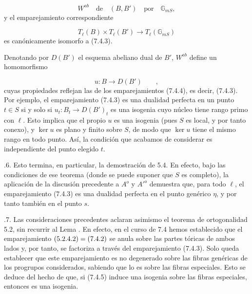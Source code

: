 \begin{equation*}
W^{ab}\quad\text{de}\quad(B,B')\quad\text{por}\quad\mathbb G_{mS},
\end{equation*}
y el emparejamiento correspondiente

\begin{equation}\tag{7.4.4}
T_{\ell}(B) \times T_{\ell}(B')
 \longrightarrow T_{\ell}(\mathbb G_{mS})
\end{equation}
es canónicamente isomorfo a (7.4.3).

Denotando por $D(B')$ el esquema abeliano dual de $B'$, $W^{ab}$ define
un homomorfismo

\begin{equation}\tag{7.4.5}
u:B\longrightarrow D(B') \qquad ,
\end{equation}
cuyas propiedades reflejan las de los emparejamientos (7.4.4), es
decir, (7.4.3). Por ejemplo, el emparejamiento (7.4.3) es una dualidad
perfecta en un punto $t\in S$ si y solo si
$u_t:B_t\longrightarrow D(B')_t$ es una isogenia cuyo núcleo tiene
rango primo con $\ell$. Esto implica que el propio $u$ es una isogenia
(pues $S$ es local, y por tanto conexo), y $\ker u$ es plano y finito
sobre $S$, de modo que $\ker u$ tiene el mismo rango en todo punto. Así,
la condición que acabamos de considerar es independiente del punto
elegido $t$.

\medskip
{}.6. Esto termina, en particular, la demostración de 5.4. En efecto,
bajo las condiciones de ese teorema (donde se puede suponer que $S$ es
completo), la aplicación de la discusión precedente a $A^o$ y
${A'}^o$ demuestra que, para todo $\ell$, el emparejamiento (7.4.3) es
una dualidad perfecta en el punto genérico $\eta$, y por tanto también
en el punto $s$.


\medskip
{}.7. Las consideraciones precedentes aclaran asimismo el teorema de
ortogonalidad 5.2, sin recurrir al Lema . En efecto, en el curso de
7.4 hemos establecido que el emparejamiento $\sisi{(5.2.3.1)}{(5.2.4.2)}=(7.4.2)$ se
anula sobre las partes tóricas de ambos lados y, por tanto, se factoriza
a través del emparejamiento (7.4.3). Solo queda establecer que este
emparejamiento es no degenerado sobre las fibras genéricas de los
progrupos considerados, sabiendo que lo es sobre las fibras especiales.
Esto se deduce del hecho de que, si (7.4.5) induce una isogenia sobre
las fibras especiales, entonces es una isogenia.


